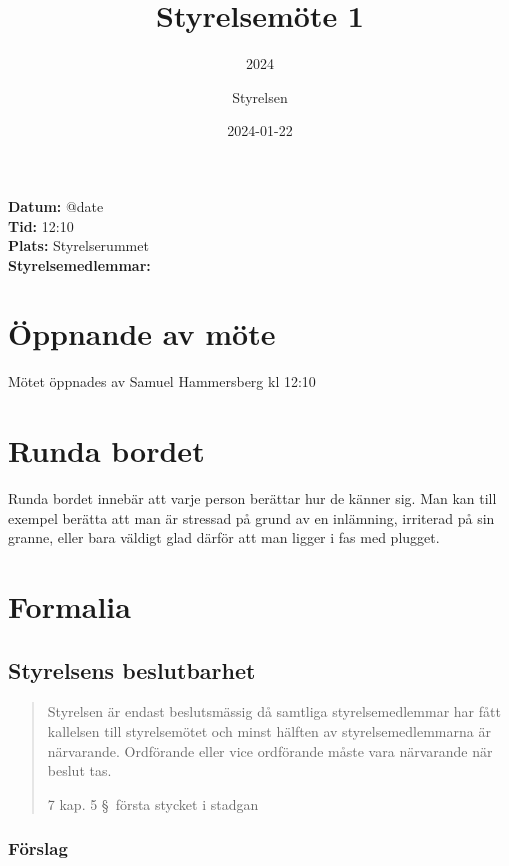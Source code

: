 \documentclass[protokoll]{dvd}
\begin{document}
\title{Styrelsemöte 1}
\subtitle{2024}
\author{Styrelsen}
\date{2024-01-22}


\textbf{Datum:} \csname @date\endcsname\\
\textbf{Tid:} 12:10\\
\textbf{Plats:} Styrelserummet\\
\textbf{Styrelsemedlemmar:}
\begin{närvarande_förtroendevalda}
\end{närvarande_förtroendevalda}

\section{Öppnande av möte}

Mötet öppnades av Samuel Hammersberg kl 12:10

\section{Runda bordet}

Runda bordet innebär att varje person berättar hur de känner sig.
Man kan till exempel berätta att man är stressad på grund av en inlämning, irriterad på sin granne, eller bara väldigt glad därför att man ligger i fas med plugget.

\section{Formalia}

\subsection{Styrelsens beslutbarhet}

\blockquote[7 kap. 5 \S~första stycket i stadgan][]{%
    Styrelsen är endast beslutsmässig då samtliga styrelsemedlemmar har fått kallelsen till styrelsemötet och minst hälften av styrelsemedlemmarna är närvarande.
    Ordförande eller vice ordförande måste vara närvarande när beslut tas.
}

\subsubsection*{Förslag}
\end{document}
